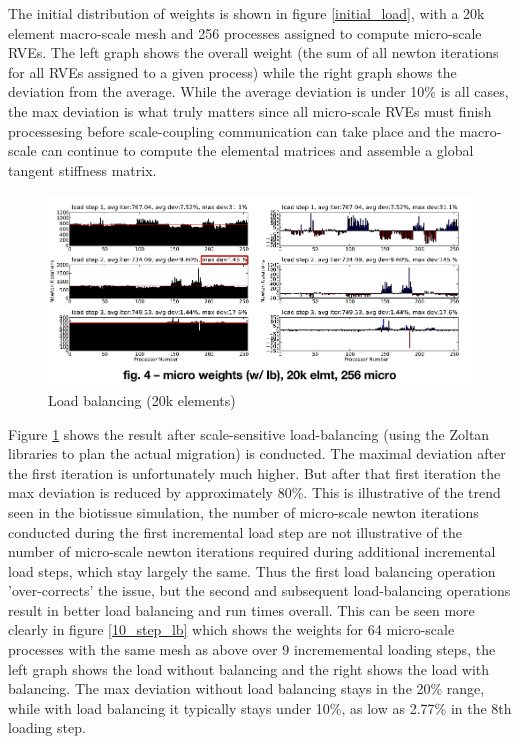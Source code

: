 The initial distribution of weights is shown in figure \ref{initial_load}, with a 20k element macro-scale mesh and 256 processes assigned to compute micro-scale RVEs. The left graph shows the overall weight (the sum of all newton iterations for all RVEs assigned to a given process) while the right graph shows the deviation from the average. While the average deviation is under 10\% is all cases, the max deviation is what truly matters since all micro-scale RVEs must finish processesing before scale-coupling communication can take place and the macro-scale can continue to compute the elemental matrices and assemble a global tangent stiffness matrix. 

\begin{figure}
  \begin{center}
    \includegraphics[height=2in]{siam_cse_updated.png}
  \end{center}
  \caption{\small Load balancing (20k elements)}
  \label{load_balancing}
\end{figure}

Figure \ref{load_balancing} shows the result after scale-sensitive load-balancing (using the Zoltan libraries to plan the actual migration) is conducted. The maximal deviation after the first iteration is unfortunately much higher. But after that first iteration the max deviation is reduced by approximately 80\%. This is illustrative of the trend seen in the biotissue simulation, the number of micro-scale newton iterations conducted during the first incremental load step are not illustrative of the number of micro-scale newton iterations required during additional incremental load steps, which stay largely the same. Thus the first load balancing operation 'over-corrects' the issue, but the second and subsequent load-balancing operations result in better load balancing and run times overall. This can be seen more clearly in figure \ref{10_step_lb} which shows the weights for 64 micro-scale processes with the same mesh as above over 9 incrememental loading steps, the left graph shows the load without balancing and the right shows the load with balancing. The max deviation without load balancing stays in the 20\% range, while with load balancing it typically stays under 10\%, as low as 2.77\% in the 8th loading step.

